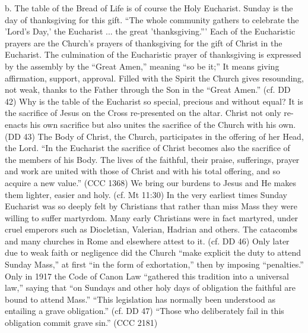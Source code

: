 \documentclass[oneside]{book}
\begin{document}
b. The table of the Bread of Life is of course the Holy Eucharist. Sunday is the
day of thanksgiving for this gift. ``The whole community gathers to celebrate
the 'Lord's Day,' the Eucharist ... the great 'thanksgiving.''' Each of the
Eucharistic prayers are the Church's prayers of thanksgiving for the gift of
Christ in the Eucharist. The culmination of the Eucharistic prayer of
thanksgiving is expressed by the assembly by the ``Great Amen,'' meaning ``so be
it;'' It means giving affirmation, support, approval. Filled with the Spirit the
Church gives resounding, not weak, thanks to the Father through the Son in the
``Great Amen.'' (cf. DD 42)
Why is the table of the Eucharist so special, precious and without equal? It is
the sacrifice of Jesus on the Cross re-presented on the altar. Christ not only
re-enacts his own sacrifice but also unites the sacrifice of the Church with his
own. (DD 43) The Body of Christ, the Church, participates in the offering of her
Head, the Lord. ``In the Eucharist the sacrifice of Christ becomes also the
sacrifice of the members of his Body. The lives of the faithful, their praise,
sufferings, prayer and work are united with those of Christ and with his total
offering, and so acquire a new value.'' (CCC 1368) We bring our burdens to Jesus
and He makes them lighter, easier and holy. (cf. Mt 11:30)
In the very earliest times Sunday Eucharist was so deeply felt by Christians
that rather than miss Mass they were willing to suffer martyrdom. Many early
Christians were in fact martyred, under cruel emperors such as Diocletian,
Valerian, Hadrian and others. The catacombs and many churches in Rome and
elsewhere attest to it. (cf. DD 46) Only later due to weak faith or negligence
did the Church ``make explicit the duty to attend Sunday Mass,'' at first ``in
the form of exhortation,'' then by imposing ``penalties.'' Only in 1917 the Code
of Canon Law ``gathered this tradition into a universal law,'' saying that ``on
Sundays and other holy days of obligation the faithful are bound to attend
Mass.'' ``This legislation has normally been understood as entailing a grave
obligation.'' (cf. DD 47) ``Those who deliberately fail in this obligation
commit grave sin.'' (CCC 2181)
\end{document}
